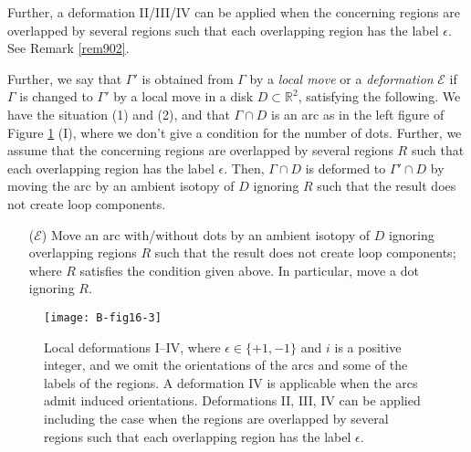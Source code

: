 \documentclass[a4paper,11pt]{amsart}
\numberwithin{equation}{section}
\begin{document}
\begin{definition}
\begin{enumerate}
\begin{enumerate}
\end{enumerate}
Further, 
a deformation II/III/IV can be applied when the concerning regions are overlapped by several regions such that each overlapping region has the label $\epsilon $. 
See Remark \ref{rem902}. 
\end{enumerate}

Further, we say that $\Gamma'$ is obtained from $\Gamma$ by 
a {\it local move} or a {\it deformation} $\mathcal{E}$ if $\Gamma$ is changed to $\Gamma'$ by a local move in a disk $D\subset \mathbb{R}^2$, satisfying the following. 
We have the situation (1) and (2), and that $\Gamma \cap D$ is an arc as in the left figure of Figure \ref{Fig3} (I), 
where we don't give a condition for the number of dots. 
Further, we assume that the concerning regions are overlapped by several regions $R$ such that each overlapping region has the label $\epsilon$. 
Then, $\Gamma \cap D$ is deformed to $\Gamma'\cap D$ by moving the arc 
 by an ambient isotopy of $D$ ignoring $R$ such that the result does not create loop components. 

\begin{enumerate}

\item[($\mathcal{E}$)] 
Move an arc with/without dots  
 by an ambient isotopy of $D$ ignoring overlapping regions $R$ such that the result does not create loop components; where $R$ satisfies the condition given above. 
In particular, move a dot ignoring $R$. 
\end{enumerate}


\end{definition}

\begin{figure}[ht]
\centering
\texttt{[image: B-fig16-3]}
\caption{Local deformations I--IV, where $\epsilon \in \{+1, -1\}$ and $i$ is a positive integer, and we omit the orientations of the arcs and some of the labels of the regions. A deformation IV is  applicable when the arcs admit induced orientations. 
Deformations II, III, IV can be applied including the case when the regions are overlapped by several regions such that each overlapping region has the label $\epsilon$.}  %
\label{Fig3}
\end{figure}
\end{document}
